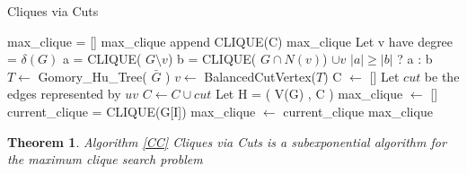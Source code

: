 \documentclass[12pt]{article}
\newtheorem{thm}{Theorem}[section]
\begin{document}
\begin{algorithm}
\caption{Cliques via Cuts}\label{CC}
\begin{algorithmic}[1]
\State max\_clique = []
\State max\_clique append CLIQUE(C)
\EndFor
\State \Return max\_clique
\EndIf
{}
\State Let v have degree = $\delta(G)$
\State a = CLIQUE( $G \setminus v$)
\State b = CLIQUE( $G \cap N(v) $) $\cup v$
\State \Return $|a| \ge |b|$ ? a : b
\EndIf
\State $ T \gets$ Gomory\_Hu\_Tree( $\bar{G}$ )
\State $ v \gets$ BalancedCutVertex($T$)
\State C $\gets$ []
\State Let $cut$ be the edges represented by $uv$
\State $C \gets C \cup cut $
\EndFor
\State Let H = ( V(G) , C )
\State max\_clique $\gets$ []
\State current\_clique = CLIQUE(G[I])
max\_clique $\gets$ current\_clique \EndIf
\EndFor
\State \Return max\_clique
\EndProcedure
\end{algorithmic}
\end{algorithm}

\begin{thm} \label{main} Algorithm \ref{CC} Cliques via Cuts  is a subexponential algorithm for the maximum clique search problem\end{thm}
\end{document}
